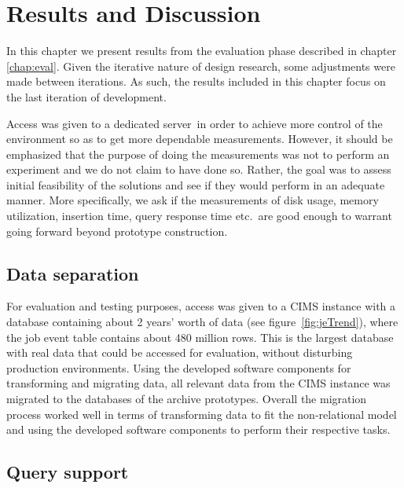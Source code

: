 \chapter{Results and Discussion}
\label{chap:results}

In this chapter we present results from the evaluation phase described in chapter \ref{chap:eval}. Given the iterative nature of design research, some adjustments were made between iterations. As such, the results included in this chapter focus on the last iteration of development.

Access was given to a dedicated server\footnotemark\ in order to achieve more control of the environment so as to get more dependable measurements. However, it should be emphasized that the purpose of doing the measurements was not to perform an experiment and we do not claim to have done so. Rather, the goal was to assess initial feasibility of the solutions and see if they would perform in an adequate manner. More specifically, we ask if the measurements of disk usage, memory utilization, insertion time, query response time etc.\ are good enough to warrant going forward beyond prototype construction.


\section{Data separation}
For evaluation and testing purposes, access was given to a CIMS instance with a database containing about 2 years' worth of data (see figure~\ref{fig:jeTrend}), where the job event table contains about 480 million rows. This is the largest database with real data that could be accessed for evaluation, without disturbing production environments. Using the developed software components for transforming and migrating data, all relevant data from the CIMS instance was migrated to the databases of the archive prototypes. Overall the migration process worked well in terms of transforming data to fit the non-relational model and using the developed software components to perform their respective tasks.


\section{Query support}

